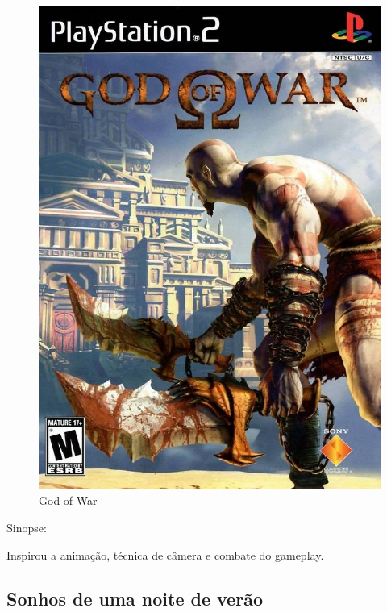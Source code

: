 \begin{figure}[htb]
	\caption{\label{god_of_war}God of War}
	\begin{center}
	    \includegraphics[width=\textwidth/2]{imagens/GodofWar.jpg}
	\end{center}
\end{figure}
Sinopse:

Inspirou a animação, técnica de câmera e combate do gameplay.

\clearpage

\subsection{Sonhos de uma noite de verão}

